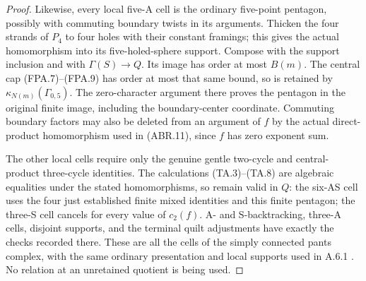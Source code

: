 \begin{proof}
Likewise, every local five-A cell is the ordinary
five-point pentagon, possibly with commuting boundary
twists in its arguments.  Thicken the four strands
of $P_4$ to four holes with their constant framings;
this gives the actual homomorphism into its
five-holed-sphere support.  Compose with the support
inclusion and with $\Gamma(S)\to Q$.
Its image has order at most $B(m)$.  The central
cap (FPA.7)--(FPA.9) has order at most that same
bound, so is retained by $\kappa_{N(m)}(\Gamma_{0,5})$.
The zero-character argument there proves the
pentagon in the original finite image, including
the boundary-center coordinate.  Commuting boundary
factors may also be deleted from an argument of
$f$ by the actual direct-product homomorphism used
in (ABR.11), since $f$ has zero exponent sum.

The other local cells require only the genuine gentle
two-cycle and central-product three-cycle identities.
The calculations (TA.3)--(TA.8) are algebraic
equalities under the stated homomorphisms, so remain
valid in $Q$: the six-AS cell uses the four just
established finite mixed identities and this finite
pentagon; the three-S cell cancels for every value
of $c_2(f)$.  A- and S-backtracking, three-A cells,
disjoint supports, and the terminal quilt adjustments
have exactly the checks recorded there.
These are all the cells of the simply connected
pants complex, with the same ordinary presentation
and local supports used in A.6.1
\cite[Theorem~8.2, Definition~7.2 and Claim~8.3]{ET_NS2000}.
No relation at an unretained quotient is being used.


\end{proof}
